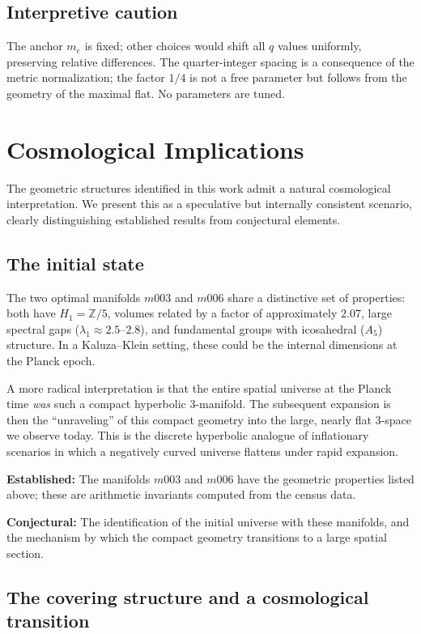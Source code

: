 ﻿\documentclass[12pt]{article}
\theoremstyle{definition}
\begin{document}
\subsection{Interpretive caution}
The anchor $m_e$ is fixed; other choices would shift all $q$ values uniformly, preserving relative differences. The quarter-integer spacing is a consequence of the metric normalization; the factor $1/4$ is not a free parameter but follows from the geometry of the maximal flat. No parameters are tuned.

\section{Cosmological Implications}
\label{sec:cosmology}

The geometric structures identified in this work admit a natural
cosmological interpretation. We present this as a speculative but
internally consistent scenario, clearly distinguishing established
results from conjectural elements.

\subsection{The initial state}

The two optimal manifolds $m003$ and $m006$ share a distinctive set
of properties: both have $H_1 = \mathbb{Z}/5$, volumes related by
a factor of approximately $2.07$, large spectral gaps
($\lambda_1 \approx 2.5$--$2.8$), and fundamental groups with
icosahedral ($A_5$) structure. In a Kaluza--Klein setting, these
could be the internal dimensions at the Planck epoch.

A more radical interpretation is that the entire spatial universe at
the Planck time \emph{was} such a compact hyperbolic 3-manifold. The
subsequent expansion is then the ``unraveling'' of this compact
geometry into the large, nearly flat 3-space we observe today. This
is the discrete hyperbolic analogue of inflationary scenarios in which
a negatively curved universe flattens under rapid expansion.

\textbf{Established:} The manifolds $m003$ and $m006$ have the
geometric properties listed above; these are arithmetic invariants
computed from the census data.

\textbf{Conjectural:} The identification of the initial universe with
these manifolds, and the mechanism by which the compact geometry
transitions to a large spatial section.

\subsection{The covering structure and a cosmological transition}
\label{sec:cover_cosm}
\end{document}

